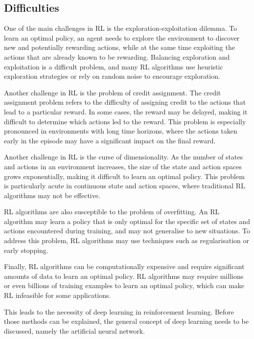 \subsection{Difficulties}
\label{sec:difficulties}
One of the main challenges in RL is the exploration-exploitation dilemma.
To learn an optimal policy, an agent needs to explore the environment to discover new and potentially rewarding actions, while at the same time exploiting the actions that are already known to be rewarding.
Balancing exploration and exploitation is a difficult problem, and many RL algorithms use heuristic exploration strategies or rely on random noise to encourage exploration.

Another challenge in RL is the problem of credit assignment.
The credit assignment problem refers to the difficulty of assigning credit to the actions that lead to a particular reward.
In some cases, the reward may be delayed, making it difficult to determine which actions led to the reward.
This problem is especially pronounced in environments with long time horizons, where the actions taken early in the episode may have a significant impact on the final reward.

Another challenge in RL is the curse of dimensionality.
As the number of states and actions in an environment increases, the size of the state and action spaces grows exponentially, making it difficult to learn an optimal policy.
This problem is particularly acute in continuous state and action spaces, where traditional RL algorithms may not be effective.

RL algorithms are also susceptible to the problem of overfitting.
An RL algorithm may learn a policy that is only optimal for the specific set of states and actions encountered during training, and may not generalise to new situations.
To address this problem, RL algorithms may use techniques such as regularisation or early stopping.

Finally, RL algorithms can be computationally expensive and require significant amounts of data to learn an optimal policy.
RL algorithms may require millions or even billions of training examples to learn an optimal policy, which can make RL infeasible for some applications.

This leads to the necessity of deep learning in reinforcement learning.
Before those methods can be explained, the general concept of deep learning needs to be discussed, namely the artificial neural network.